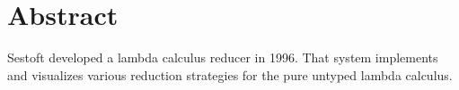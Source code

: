 \chapter*{Abstract}

Sestoft developed a lambda calculus reducer in 1996. That system implements and visualizes various reduction strategies for the pure untyped lambda calculus.